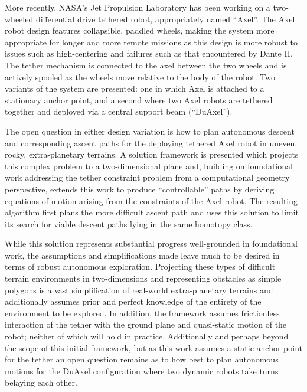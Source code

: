 \documentclass[12pt]{article}
\begin{document}
More recently, NASA's Jet Propulsion Laboratory has been working on a two-wheeled
differential drive tethered robot, appropriately named ``Axel''. The Axel robot 
design features collapsible, paddled wheels, making the system more appropriate for longer 
and more remote missions as this design is more robust to issues such as high-centering and 
failures such as that encountered by Dante II. The tether mechanism is connected to the axel 
between the two wheels and is actively spooled as the wheels move relative to the body of the robot. 
Two variants of the system are presented: one in which Axel is attached to a stationary anchor point, 
and a second where two Axel robots are tethered together and deployed via a central support beam (``DuAxel''). 

The open question in either design variation is how to plan autonomous descent and corresponding 
ascent paths for the deploying tethered Axel robot in uneven, rocky, extra-planetary terrains. 
A solution framework is presented which projects this complex problem to a two-dimensional plane and, 
building on foundational work addressing the tether constraint problem from a computational geometry 
perspective, extends this work to produce ``controllable'' paths by deriving equations of motion arising from 
the constraints of the Axel robot. The resulting algorithm first plans the more difficult ascent path and
uses this solution to limit its search for viable descent paths lying in the same homotopy class. 

While this solution represents substantial progress well-grounded in foundational work, the 
assumptions and simplifications made leave much to be desired in terms of robust autonomous
exploration. Projecting these types of difficult terrain environments in two-dimensions and representing
obstacles as simple polygons is a vast simplification of real-world extra-planetary terrains and 
additionally assumes prior and perfect knowledge of the entirety of the environment to be explored. In addition,
the framework assumes frictionless interaction of the tether with the ground plane and quasi-static 
motion of the robot; neither of which will hold in practice. Additionally and perhaps beyond the scope 
of this initial framework, but as this work assumes a static anchor point for the tether an open 
question remains as to how best to plan autonomous motions for the DuAxel configuration where two 
dynamic robots take turns belaying each other.
\end{document}
